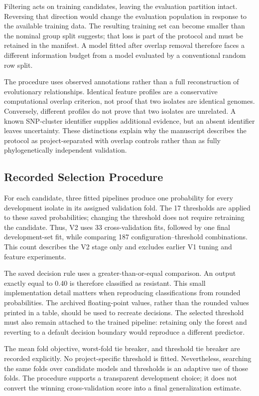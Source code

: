 Filtering acts on training candidates, leaving the evaluation partition intact. Reversing that direction would change the evaluation population in response to the available training data. The resulting training set can become smaller than the nominal group split suggests; that loss is part of the protocol and must be retained in the manifest. A model fitted after overlap removal therefore faces a different information budget from a model evaluated by a conventional random row split.

The procedure uses observed annotations rather than a full reconstruction of evolutionary relationships. Identical feature profiles are a conservative computational overlap criterion, not proof that two isolates are identical genomes. Conversely, different profiles do not prove that two isolates are unrelated. A known SNP-cluster identifier supplies additional evidence, but an absent identifier leaves uncertainty. These distinctions explain why the manuscript describes the protocol as project-separated with overlap controls rather than as fully phylogenetically independent validation.

\subsection{Recorded Selection Procedure}
For each candidate, three fitted pipelines produce one probability for every development isolate in its assigned validation fold. The 17 thresholds are applied to these saved probabilities; changing the threshold does not require retraining the candidate. Thus, V2 uses 33 cross-validation fits, followed by one final development-set fit, while comparing 187 configuration--threshold combinations. This count describes the V2 stage only and excludes earlier V1 tuning and feature experiments.

The saved decision rule uses a greater-than-or-equal comparison. An output exactly equal to 0.40 is therefore classified as resistant. This small implementation detail matters when reproducing classifications from rounded probabilities. The archived floating-point values, rather than the rounded values printed in a table, should be used to recreate decisions. The selected threshold must also remain attached to the trained pipeline: retaining only the forest and reverting to a default decision boundary would reproduce a different predictor.

The mean fold objective, worst-fold tie breaker, and threshold tie breaker are recorded explicitly. No project-specific threshold is fitted. Nevertheless, searching the same folds over candidate models and thresholds is an adaptive use of those folds. The procedure supports a transparent development choice; it does not convert the winning cross-validation score into a final generalization estimate.

